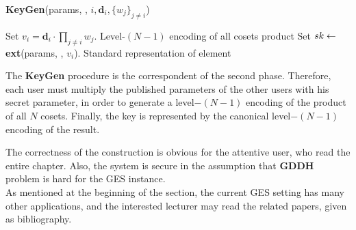 \begin{enumerate}
			\begin{tcolorbox}[colframe=black,colback=white,arc=0pt,outer arc=0pt]
		\begin{center}
			\textbf{KeyGen}(params, \pzt, $i, \textbf{d}_i, \{w_j\}_{j \neq i}$)
		\end{center}
		\begin{algorithmic}[1]
			\State Set $v_i = \textbf{d}_i \cdot \prod_{j \neq i} w_j$. \Comment Level-$(N-1)$ encoding of all cosets product
			\Statex
			\State Set $sk \leftarrow $ \textbf{ext}(params, \pzt, $v_i$). \Comment Standard representation of element
		\end{algorithmic}
	\end{tcolorbox}

	The \textbf{KeyGen} procedure is the correspondent of the second phase. Therefore, each user must multiply the published parameters of the other users with his secret parameter, in order to generate a level$-(N-1)$ encoding of the product of all $N$ cosets. Finally, the key is represented by the canonical level$-(N-1)$ encoding of the result. 
\end{enumerate}

The correctness of the construction is obvious for the attentive user, who read the entire chapter. Also, the system is secure in the assumption that \textbf{GDDH} problem is hard for the GES instance.\\

As mentioned at the beginning of the section, the current GES setting has many other applications, and the interested lecturer may read the related papers, given as bibliography.



